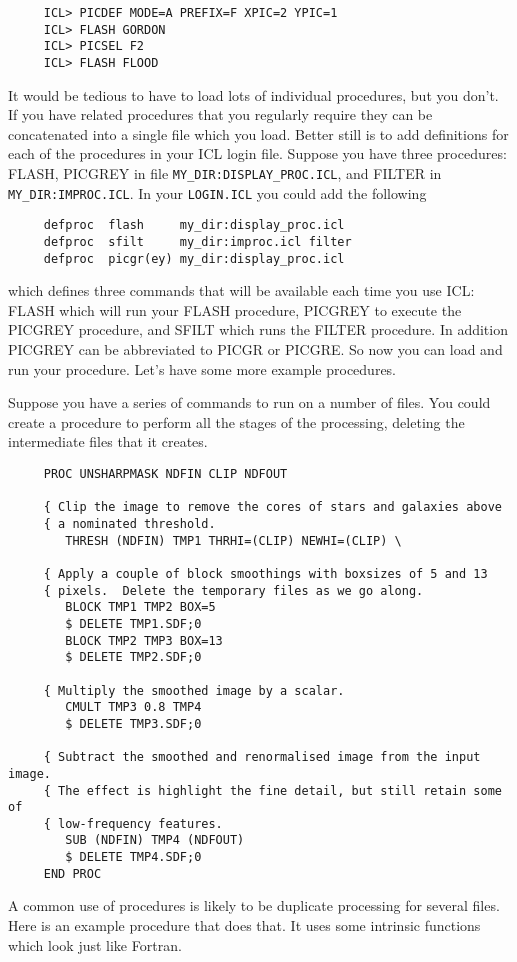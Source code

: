 {\small
\begin{verbatim}
     ICL> PICDEF MODE=A PREFIX=F XPIC=2 YPIC=1
     ICL> FLASH GORDON
     ICL> PICSEL F2
     ICL> FLASH FLOOD
\end{verbatim}
\normalsize
It would be tedious to have to load lots of individual procedures, but
you don't. If you have related procedures that you regularly require
they can be concatenated into a single file which you load.  Better
still is to add definitions for each of the procedures in your
{\small ICL} login file.
Suppose you have three procedures: FLASH, PICGREY in file
{\tt MY\_DIR:DISPLAY_PROC.ICL}, and FILTER in {\tt MY\_DIR:IMPROC.ICL}.
In your {\tt LOGIN.ICL} you could add the following

\small
\begin{verbatim}
     defproc  flash     my_dir:display_proc.icl
     defproc  sfilt     my_dir:improc.icl filter
     defproc  picgr(ey) my_dir:display_proc.icl
\end{verbatim}
\normalsize
which defines three commands that will be available each time you
use {\small ICL}: FLASH which will run your FLASH
procedure, PICGREY to execute the PICGREY procedure, and SFILT which
runs the FILTER procedure.  In addition PICGREY can be abbreviated
to PICGR or PICGRE.  So now you can load and run your procedure.
Let's have some more example procedures.

Suppose you have a series of commands to run on a number of files.  You
could create a procedure to perform all the stages of the processing,
deleting the intermediate files that it creates.

\small
\begin{verbatim}
     PROC UNSHARPMASK NDFIN CLIP NDFOUT

     { Clip the image to remove the cores of stars and galaxies above
     { a nominated threshold.
        THRESH (NDFIN) TMP1 THRHI=(CLIP) NEWHI=(CLIP) \

     { Apply a couple of block smoothings with boxsizes of 5 and 13
     { pixels.  Delete the temporary files as we go along.
        BLOCK TMP1 TMP2 BOX=5
        $ DELETE TMP1.SDF;0
        BLOCK TMP2 TMP3 BOX=13
        $ DELETE TMP2.SDF;0

     { Multiply the smoothed image by a scalar.
        CMULT TMP3 0.8 TMP4
        $ DELETE TMP3.SDF;0

     { Subtract the smoothed and renormalised image from the input image.
     { The effect is highlight the fine detail, but still retain some of
     { low-frequency features.
        SUB (NDFIN) TMP4 (NDFOUT)
        $ DELETE TMP4.SDF;0
     END PROC
\end{verbatim}
\normalsize
A common use of procedures is likely to be duplicate processing
for several files.  Here is an example procedure that does that.  It uses
some intrinsic functions which look just like Fortran.

}
